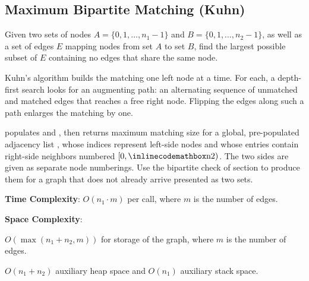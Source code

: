 \subsection{Maximum Bipartite Matching (Kuhn)}
\label{sec:4.6.2}
Given two sets of nodes $A = \{0, 1, \ldots, n_1 - 1\}$ and $B = \{0, 1, \ldots, n_2 - 1\}$, as well as a set of edges $E$ mapping nodes from set $A$ to set $B$, find the largest possible subset of $E$ containing no edges that share the same node.

Kuhn's algorithm builds the matching one left node at a time. For each, a depth-first search looks for an augmenting path: an alternating sequence of unmatched and matched edges that reaches a free right node. Flipping the edges along such a path enlarges the matching by one.

\begin{compactitem}
  \item {} populates  and , then returns maximum matching size for a global, pre-populated adjacency list , whose indices represent left-side nodes and whose entries contain right-side neighbors numbered $[0, {\inlinecodemath{n2}})$. The two sides are given as separate node numberings. Use the bipartite check of section  to produce them for a graph that does not already arrive presented as two sets.
\end{compactitem}

\textbf{Time Complexity}: $O(n_1 \cdot m)$ per call, where $m$ is the number of edges.

\textbf{Space Complexity}:
\begin{compactitem}
  \item $O(\max\left(n_1 + n_2, m\right))$ for storage of the graph, where $m$ is the number of edges.
  \item $O(n_1 + n_2)$ auxiliary heap space and $O(n_1)$ auxiliary stack space.
\end{compactitem}

